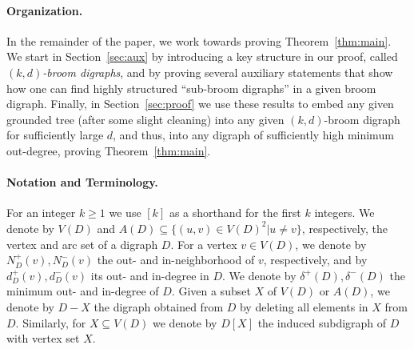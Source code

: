 \documentclass[a4paper,11pt]{article}
\theoremstyle{definition}
\begin{document}
\paragraph*{Organization.} In the remainder of the paper, we work towards proving Theorem~\ref{thm:main}. We start in Section~\ref{sec:aux} by introducing a key structure in our proof, called \emph{$(k,d)$-broom digraphs}, and by proving several auxiliary statements that show how one can find highly structured ``sub-broom digraphs'' in a given broom digraph. Finally, in Section~\ref{sec:proof} we use these results to embed any given grounded tree (after some slight cleaning) into any given $(k,d)$-broom digraph for sufficiently large $d$, and thus, into any digraph of sufficiently high minimum out-degree, proving Theorem~\ref{thm:main}.
\paragraph*{Notation and Terminology.} For an integer $k\ge 1$ we use $[k]$ as a shorthand for the first $k$ integers. We denote by $V(D)$ and $A(D)\subseteq \{(u,v)\in V(D)^2|u\neq v\}$, respectively, the vertex and arc set of a digraph $D$. For a vertex $v\in V(D)$, we denote by $N_D^+(v), N_D^-(v)$ the out- and in-neighborhood of $v$, respectively, and by $d_D^+(v), d_D^-(v)$ its out- and in-degree in $D$. We denote by $\delta^+(D), \delta^-(D)$ the minimum out- and in-degree of $D$. Given a subset $X$ of $V(D)$ or $A(D)$, we denote by $D-X$ the digraph obtained from $D$ by deleting all elements in $X$ from $D$. Similarly, for $X\subseteq V(D)$ we denote by $D[X]$ the induced subdigraph of $D$ with vertex set $X$.
\end{document}
